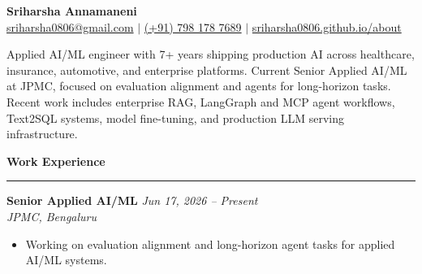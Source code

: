 \documentclass[a4paper,10pt]{article}
\newcommand{\resumesection}[1]{
    \needspace{4\baselineskip}%
    \vspace{0.22cm}
    {\large\textbf{#1}}
    \vspace{0.06cm}
    \hrule
    \vspace{0.08cm}%
    \nopagebreak
}
\newcommand{\roleheader}[4]{
    \needspace{5\baselineskip}%
    \textbf{#1} \hfill \textit{#4} \\
    \textit{#2, #3}%
    \nopagebreak
}
\begin{document}
\begin{center}
    {\Huge\textbf{Sriharsha Annamaneni}} \\[0.35em]
    \small
    \href{mailto:sriharsha0806@gmail.com}{\faEnvelope\hspace{1mm} sriharsha0806@gmail.com}
    \hspace{0.6em} $|$ \hspace{0.6em}
    \href{tel:+917981787689}{\faPhone\hspace{1mm} (+91) 798 178 7689}
    \hspace{0.6em} $|$ \hspace{0.6em}
    \href{https://sriharsha0806.github.io/about}{\faGlobe\hspace{1mm} sriharsha0806.github.io/about}
\end{center}

\vspace{0.1cm}

Applied AI/ML engineer with 7+ years shipping production AI across healthcare, insurance, automotive, and enterprise platforms. Current Senior Applied AI/ML at JPMC, focused on evaluation alignment and agents for long-horizon tasks. Recent work includes enterprise RAG, LangGraph and MCP agent workflows, Text2SQL systems, model fine-tuning, and production LLM serving infrastructure.

\resumesection{Work Experience}

\roleheader{Senior Applied AI/ML}{JPMC}{Bengaluru}{Jun 17, 2026 -- Present}
\begin{itemize}[leftmargin=*, itemsep=3pt, topsep=4pt]
    \item Working on evaluation alignment and long-horizon agent tasks for applied AI/ML systems.
\end{itemize}

\vspace{0.08cm}
\end{document}
